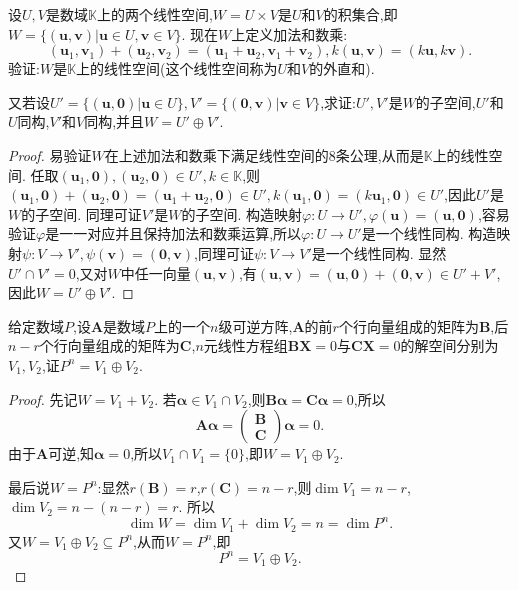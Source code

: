 \documentclass[lang=cn,newtx,10pt,scheme=chinese]{elegantbook}
\begin{document}
\begin{example}
设\(U,V\)是数域\(\mathbb{K}\)上的两个线性空间,\(W = U\times V\)是\(U\)和\(V\)的积集合,即\(W=\{(\boldsymbol{u},\boldsymbol{v})|\boldsymbol{u}\in U,\boldsymbol{v}\in V\}\). 现在\(W\)上定义加法和数乘:
\[
(\boldsymbol{u}_1,\boldsymbol{v}_1)+(\boldsymbol{u}_2,\boldsymbol{v}_2)=(\boldsymbol{u}_1+\boldsymbol{u}_2,\boldsymbol{v}_1+\boldsymbol{v}_2),k(\boldsymbol{u},\boldsymbol{v})=(k\boldsymbol{u},k\boldsymbol{v}).
\]
验证:\(W\)是\(\mathbb{K}\)上的线性空间(这个线性空间称为\(U\)和\(V\)的外直和).

又若设\(U'=\{(\boldsymbol{u},\boldsymbol{0})|\boldsymbol{u}\in U\},V'=\{(\boldsymbol{0},\boldsymbol{v})|\boldsymbol{v}\in V\}\),求证:\(U',V'\)是\(W\)的子空间,\(U'\)和\(U\)同构,\(V'\)和\(V\)同构,并且\(W = U'\oplus V'\).
\end{example}
\begin{proof}
易验证\(W\)在上述加法和数乘下满足线性空间的8条公理,从而是\(\mathbb{K}\)上的线性空间. 任取\((\boldsymbol{u}_1,\boldsymbol{0}),(\boldsymbol{u}_2,\boldsymbol{0})\in U',k\in\mathbb{K}\),则\((\boldsymbol{u}_1,\boldsymbol{0})+(\boldsymbol{u}_2,\boldsymbol{0})=(\boldsymbol{u}_1+\boldsymbol{u}_2,\boldsymbol{0})\in U',k(\boldsymbol{u}_1,\boldsymbol{0})=(k\boldsymbol{u}_1,\boldsymbol{0})\in U'\),因此\(U'\)是\(W\)的子空间. 同理可证\(V'\)是\(W\)的子空间. 构造映射\(\varphi:U\to U',\varphi(\boldsymbol{u})=(\boldsymbol{u},\boldsymbol{0})\),容易验证\(\varphi\)是一一对应并且保持加法和数乘运算,所以\(\varphi:U\to U'\)是一个线性同构. 构造映射\(\psi:V\to V',\psi(\boldsymbol{v})=(\boldsymbol{0},\boldsymbol{v})\),同理可证\(\psi:V\to V'\)是一个线性同构. 显然\(U'\cap V' = 0\),又对\(W\)中任一向量\((\boldsymbol{u},\boldsymbol{v})\),有\((\boldsymbol{u},\boldsymbol{v})=(\boldsymbol{u},\boldsymbol{0})+(\boldsymbol{0},\boldsymbol{v})\in U'+V'\),因此\(W = U'\oplus V'\). 
\end{proof}

\begin{example}\label{example:561.16}
给定数域\(P\),设\(\boldsymbol{A}\)是数域\(P\)上的一个\(n\)级可逆方阵,\(\boldsymbol{A}\)的前\(r\)个行向量组成的矩阵为\(\boldsymbol{B}\),后\(n - r\)个行向量组成的矩阵为\(\boldsymbol{C}\),\(n\)元线性方程组\(\boldsymbol{B}\boldsymbol{X}=0\)与\(\boldsymbol{C}\boldsymbol{X}=0\)的解空间分别为\(V_1,V_2\),证\(P^n = V_1\oplus V_2\).
\end{example}
\begin{proof}
先记\(W = V_1 + V_2\). 若\(\boldsymbol{\alpha}\in V_1\cap V_2\),则\(\boldsymbol{B}\boldsymbol{\alpha}=\boldsymbol{C}\boldsymbol{\alpha}=0\),所以
\[
\boldsymbol{A}\boldsymbol{\alpha}=\begin{pmatrix}
\boldsymbol{B}\\
\boldsymbol{C}
\end{pmatrix}\boldsymbol{\alpha}=0.
\]
由于\(\boldsymbol{A}\)可逆,知\(\boldsymbol{\alpha}=0\),所以\(V_1\cap V_1 = \{0\}\),即\(W = V_1\oplus V_2\).

最后说\(W = P^n\):显然\(r(\boldsymbol{B}) = r\),\(r(\boldsymbol{C}) = n - r\),则\(\dim V_1 = n - r\),\(\dim V_2 = n-(n - r)=r\). 所以
\[
\dim W=\dim V_1+\dim V_2=n=\dim P^n.
\]
又\(W = V_1\oplus V_2\subseteq P^n\),从而\(W = P^n\),即
\[
P^n = V_1\oplus V_2.
\]  
\end{proof}
\end{document}
